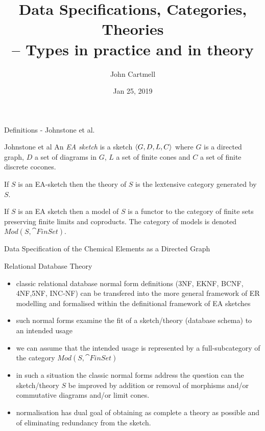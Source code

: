 \documentclass[xcolor=pst,dvips]{beamer}   %
\title[Types in practice and in theory]{Data Specifications, Categories, Theories\\ -- Types in practice and in theory}
\author{John Cartmell}
\institute{Otium}
\date{Jan 25, 2019}
\begin{document}
\newcommand{\attr}[1]{#1}
\renewcommand{\attr}[1]{\psframebox[linecolor=red,framearc=.1]{#1}}
\newcommand{\attrtype}[1]{#1}
\renewcommand{\attrtype}[1]{\psframebox[linecolor=blue,framearc=.1]{#1}}
\newcommand{\etype}[1]{#1}
\renewcommand{\etype}[1]{\psframebox[linecolor=red,framearc=.1]{#1}}

\newcommand{\CEsymboltype}[0]{varchar(2)}
\newcommand{\CEatomicnumbertype}{number(1,1000)}
\newcommand{\CEfloattype}{float}
\newcommand{\CEnametype}{varchar(64)}
\newcommand{\CEvalencynumbertype}{number(-7,7)}

\begin{frame}{Definitions - Johnstone et al.}
\begin{definition}{Johnstone et al}
An \textit{EA sketch} is a sketch $\langle G,D,L,C\rangle$ where $G$ is a directed graph, $D$ a set of diagrams in $G$, $L$ a set of finite cones and
$C$ a set of finite discrete cocones.
\end{definition}


If $S$ is an EA-sketch then the theory of $S$ is the lextensive category generated by $S$.

If $S$ is an EA sketch then a model of $S$ is a functor to the category of finite sets preserving finite limits and coproducts.
The category of models is denoted $Mod(S,\cat{FinSet})$.
\end{frame}

\begin{frame}{Data Specification of the Chemical Elements as a Directed Graph}
\scalebox{0.65}{

} 
\end{frame}

\begin{frame}{Relational Database Theory}
\begin{itemize}
\item classic relational database normal form definitions ({\scriptsize 3NF, EKNF, BCNF, 4NF,5NF, INC-NF}) can be transfered into the more general framework
of ER modelling and formalised within the definitional framework of EA sketches

\item such normal forms  examine the fit of a sketch/theory (database schema) to an intended usage

\item we can assume that the intended usage is represented by a full-subcategory of the category $Mod(S,\cat{FinSet})$

\item in such a situation the classic normal forms address the question can the sketch/theory $S$ be improved by addition or removal of morphisms and/or commutative diagrams and/or limit cones.
\item normalisation has dual goal of obtaining as complete a theory as possible and of eliminating redundancy from the sketch.  
\end{itemize}
\end{frame}
\end{document}
